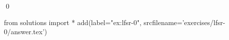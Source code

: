 
\begin{ex} 
  \label{ex:lfsr-0}
  
  \qed
\end{ex} 
\begin{python0}
from solutions import *
add(label="ex:lfsr-0",
    srcfilename='exercises/lfsr-0/answer.tex') 
\end{python0}

